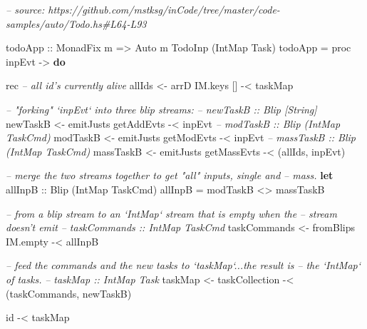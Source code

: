\documentclass[]{article}
\newenvironment{Shaded}{}{}
\newcommand{\CommentTok}[1]{\textcolor[rgb]{0.38,0.63,0.69}{\textit{#1}}}
\newcommand{\DataTypeTok}[1]{\textcolor[rgb]{0.56,0.13,0.00}{#1}}
\newcommand{\FunctionTok}[1]{\textcolor[rgb]{0.02,0.16,0.49}{#1}}
\newcommand{\KeywordTok}[1]{\textcolor[rgb]{0.00,0.44,0.13}{\textbf{#1}}}
\newcommand{\NormalTok}[1]{#1}
\newcommand{\OtherTok}[1]{\textcolor[rgb]{0.00,0.44,0.13}{#1}}
\begin{document}
\begin{Shaded}
\begin{Highlighting}[]
\CommentTok{-- source: https://github.com/mstksg/inCode/tree/master/code-samples/auto/Todo.hs#L64-L93}

\OtherTok{todoApp ::} \DataTypeTok{MonadFix}\NormalTok{ m }\OtherTok{=>} \DataTypeTok{Auto}\NormalTok{ m }\DataTypeTok{TodoInp}\NormalTok{ (}\DataTypeTok{IntMap} \DataTypeTok{Task}\NormalTok{)}
\NormalTok{todoApp }\FunctionTok{=}\NormalTok{ proc inpEvt }\OtherTok{->} \KeywordTok{do}

\NormalTok{    rec }\CommentTok{-- all id's currently alive}
\NormalTok{        allIds }\OtherTok{<-}\NormalTok{ arrD IM.keys [] }\FunctionTok{-<}\NormalTok{ taskMap}

        \CommentTok{-- "forking" `inpEvt` into three blip streams:}
        \CommentTok{-- newTaskB :: Blip [String]}
\NormalTok{        newTaskB  }\OtherTok{<-}\NormalTok{ emitJusts getAddEvts  }\FunctionTok{-<}\NormalTok{ inpEvt}
        \CommentTok{-- modTaskB :: Blip (IntMap TaskCmd)}
\NormalTok{        modTaskB  }\OtherTok{<-}\NormalTok{ emitJusts getModEvts  }\FunctionTok{-<}\NormalTok{ inpEvt}
        \CommentTok{-- massTaskB :: Blip (IntMap TaskCmd)}
\NormalTok{        massTaskB }\OtherTok{<-}\NormalTok{ emitJusts getMassEvts }\FunctionTok{-<}\NormalTok{ (allIds, inpEvt)}

        \CommentTok{-- merge the two streams together to get "all" inputs, single and}
        \CommentTok{-- mass.}
        \KeywordTok{let}\OtherTok{ allInpB ::} \DataTypeTok{Blip}\NormalTok{ (}\DataTypeTok{IntMap} \DataTypeTok{TaskCmd}\NormalTok{)}
\NormalTok{            allInpB }\FunctionTok{=}\NormalTok{ modTaskB }\FunctionTok{<>}\NormalTok{ massTaskB}

        \CommentTok{-- from a blip stream to an `IntMap` stream that is empty when the}
        \CommentTok{-- stream doesn't emit}
        \CommentTok{-- taskCommands :: IntMap TaskCmd}
\NormalTok{        taskCommands }\OtherTok{<-}\NormalTok{ fromBlips IM.empty }\FunctionTok{-<}\NormalTok{ allInpB}

        \CommentTok{-- feed the commands and the new tasks to `taskMap`...the result is}
        \CommentTok{-- the `IntMap` of tasks.}
        \CommentTok{-- taskMap :: IntMap Task}
\NormalTok{        taskMap }\OtherTok{<-}\NormalTok{ taskCollection }\FunctionTok{-<}\NormalTok{ (taskCommands, newTaskB)}

\NormalTok{    id }\FunctionTok{-<}\NormalTok{ taskMap}
\end{Highlighting}
\end{Shaded}
\end{document}

